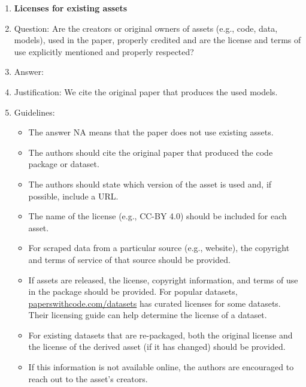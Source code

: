 \documentclass{article}
\begin{document}
\begin{enumerate}
\item {\bf Licenses for existing assets}
    \item[] Question: Are the creators or original owners of assets (e.g., code, data, models), used in the paper, properly credited and are the license and terms of use explicitly mentioned and properly respected?
    \item[] Answer: \answerYes{} %
    \item[] Justification: We cite the original paper that produces the used models.
    \item[] Guidelines:
    \begin{itemize}
        \item The answer NA means that the paper does not use existing assets.
        \item The authors should cite the original paper that produced the code package or dataset.
        \item The authors should state which version of the asset is used and, if possible, include a URL.
        \item The name of the license (e.g., CC-BY 4.0) should be included for each asset.
        \item For scraped data from a particular source (e.g., website), the copyright and terms of service of that source should be provided.
        \item If assets are released, the license, copyright information, and terms of use in the package should be provided. For popular datasets, \url{paperswithcode.com/datasets} has curated licenses for some datasets. Their licensing guide can help determine the license of a dataset.
        \item For existing datasets that are re-packaged, both the original license and the license of the derived asset (if it has changed) should be provided.
        \item If this information is not available online, the authors are encouraged to reach out to the asset's creators.
    \end{itemize}


\end{enumerate}
\end{document}
